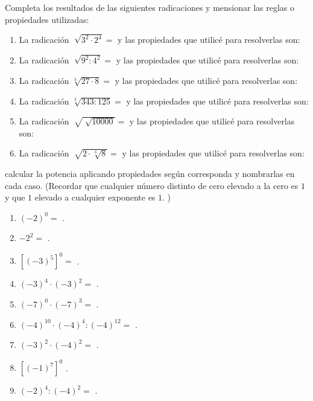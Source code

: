 \documentclass[12pt]{examdesign}
\theoremstyle{plain}
\theoremstyle{definition}
\theoremstyle{remark}
\begin{document}
	\begin{fillin}[title={Leemos el material de consulta y realizamos las actividades propuestas}, rearrange=no]
		
		\begin{question}
			Completa los resultados de las siguientes radicaciones y mensionar las reglas o propiedades utilizadas:
			\begin{enumerate}
				\item La radicación $\sqrt[]{3^2\cdot 2^{4}}=$ y las propiedades que utilicé para resolverlas son:
				
				\hrulefill
				\item La radicación $\sqrt[]{9^2: 4^{2}}=$ y las propiedades que utilicé para resolverlas son:
				
				\hrulefill
				\item La radicación $\sqrt[3]{27\cdot 8}=$ y las propiedades que utilicé para resolverlas son:
				
				\hrulefill
				\item La radicación $\sqrt[3]{343:125}=$ y las propiedades que utilicé para resolverlas son:
				
				\hrulefill
				\item La radicación $\sqrt[]{\sqrt[]{10000}}=$ y las propiedades que utilicé para resolverlas son:
				
				\hrulefill
				\item La radicación $\sqrt[]{2\cdot\sqrt[3]{8}}=$ y las propiedades que utilicé para resolverlas son:
				
				\hrulefill
			\end{enumerate}
		\end{question}
	    \begin{question}
	    calcular la potencia aplicando propiedades según corresponda y nombrarlas en cada caso. (Recordar que cualquier número distinto de cero elevado a la cero es $1$ y que $1$ elevado a cualquier exponente es $1$. )
	    	\begin{enumerate}
	    		\item $(-2)^0=$ \blank{ $(-4)^{2}$}.
	    		\item $-2^2=$ \blank{ $(-2)^{5}$}.
	    		\item $\left[(-3)^5\right]^{0}=$ \blank{ $(-2)^{3}$}.
	    		\item $(-3)^{4}\cdot(-3)^{2}=$ \blank{ $9^{0}$}.
	    		\item $(-7)^{0}\cdot(-7)^{3}=$ \blank{ $(-4)^{2}$}.
	    		\item $(-4)^{10}\cdot(-4)^{4}:(-4)^{12}=$ \blank{ $(-4)^{2}$} .
	    		\item $(-3)^{2}\cdot(-4)^{2}=$ \blank{ $(-4)^{2}$}.
	    		\item $\left[(-1)^{7}\right]^0$ \blank{ $(-2)^4=$ }.
	    		\item $(-2)^4:(-4)^{2}=$ \blank{ $(-2)^4=$ }.
	    	\end{enumerate}
	    \end{question}
    \end{fillin}
\end{document}
